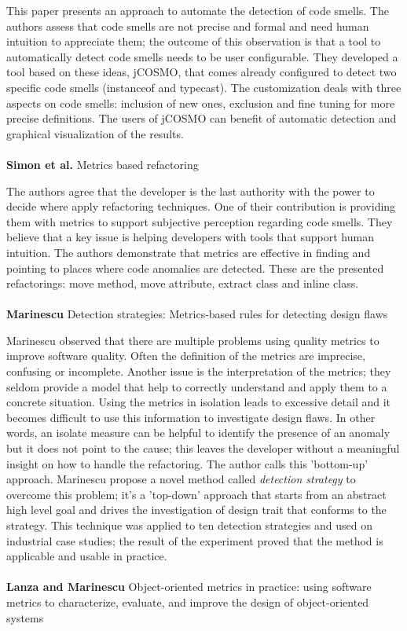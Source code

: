 This paper presents an approach to automate the detection of code smells. The authors assess that code smells are not precise and formal and need human intuition to appreciate them; the outcome of this observation is that a tool to automatically detect code smells needs to be user configurable.
They developed a tool based on these ideas, jCOSMO, that comes already configured to detect two specific code smells (instanceof and typecast). The customization deals with three aspects on code smells: inclusion of new ones, exclusion and fine tuning for more precise definitions.
The users of jCOSMO can benefit of automatic detection and graphical visualization of the results.
\\
\\
\textbf{Simon et al.} \cite{simon2001metrics} Metrics based refactoring

The authors agree that the developer is the last authority with the power to decide where apply refactoring techniques. One of their contribution is providing them with metrics to support subjective perception regarding code smells. They believe that a key issue is helping developers with tools that support human intuition. 
The authors demonstrate that metrics are effective in finding and pointing to places where code anomalies are detected. These are the presented refactorings: move method, move attribute, extract class and inline class.
\\
\\
\textbf{Marinescu} \cite{marinescu2004detection} Detection strategies: Metrics-based rules for detecting design flaws

Marinescu observed that there are multiple problems using quality metrics to improve software quality. Often the definition of the metrics are imprecise, confusing or incomplete. Another issue is the interpretation of the metrics; they seldom provide a model that help to correctly understand and apply them to a concrete situation. 
Using the metrics in isolation leads to excessive detail and it becomes difficult to use this information to investigate design flaws. In other words, an isolate measure can be helpful to identify the presence of an anomaly but it does not point to the cause; this leaves the developer without a meaningful insight on how to handle the refactoring. The author calls this 'bottom-up' approach.
Marinescu propose a novel method called \emph{detection strategy} to overcome this problem; it's a 'top-down' approach that starts from an abstract high level goal and drives the investigation of design trait that conforms to the strategy.
This technique was applied to ten detection strategies and used on industrial case studies; the result of the experiment proved that the method is applicable and usable in practice.
\\
\\
\textbf{Lanza and Marinescu} \cite{lanza2007object} Object-oriented metrics in practice: using software metrics to characterize, evaluate, and improve the design of object-oriented systems

